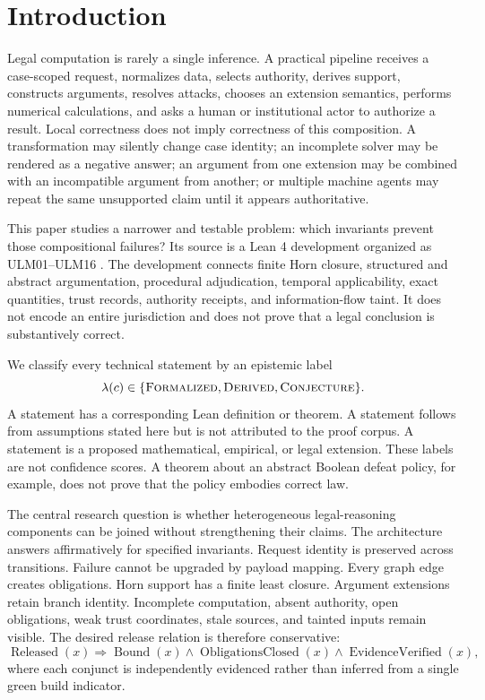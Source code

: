 \section{Introduction}

Legal computation is rarely a single inference. A practical pipeline receives a case-scoped request, normalizes data, selects authority, derives support, constructs arguments, resolves attacks, chooses an extension semantics, performs numerical calculations, and asks a human or institutional actor to authorize a result. Local correctness does not imply correctness of this composition. A transformation may silently change case identity; an incomplete solver may be rendered as a negative answer; an argument from one extension may be combined with an incompatible argument from another; or multiple machine agents may repeat the same unsupported claim until it appears authoritative.

This paper studies a narrower and testable problem: which invariants prevent those compositional failures? Its source is a Lean 4 development organized as ULM01--ULM16 \citep{DeMouraUllrich2021,Mathlib2020,LegalMathModeling2026}. The development connects finite Horn closure, structured and abstract argumentation, procedural adjudication, temporal applicability, exact quantities, trust records, authority receipts, and information-flow taint. It does not encode an entire jurisdiction and does not prove that a legal conclusion is substantively correct.

We classify every technical statement by an epistemic label
\begin{equation}
\lambda(c)\in\{\textsc{Formalized},\textsc{Derived},\textsc{Conjecture}\}.
\label{eq:claim-label}
\end{equation}
A \formalized{} statement has a corresponding Lean definition or theorem. A \derived{} statement follows from assumptions stated here but is not attributed to the proof corpus. A \conjectured{} statement is a proposed mathematical, empirical, or legal extension. These labels are not confidence scores. A theorem about an abstract Boolean defeat policy, for example, does not prove that the policy embodies correct law.

The central research question is whether heterogeneous legal-reasoning components can be joined without strengthening their claims. The architecture answers affirmatively for specified invariants. Request identity is preserved across transitions. Failure cannot be upgraded by payload mapping. Every graph edge creates obligations. Horn support has a finite least closure. Argument extensions retain branch identity. Incomplete computation, absent authority, open obligations, weak trust coordinates, stale sources, and tainted inputs remain visible. The desired release relation is therefore conservative:
\begin{equation}
\operatorname{Released}(x)\Longrightarrow
\operatorname{Bound}(x)\land\operatorname{ObligationsClosed}(x)
\land\operatorname{EvidenceVerified}(x),
\label{eq:release-relation}
\end{equation}
where each conjunct is independently evidenced rather than inferred from a single green build indicator.

